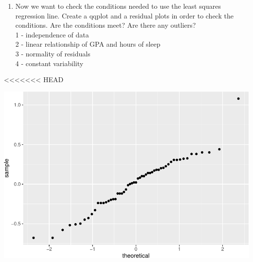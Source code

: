 \documentclass[]{article}
\newenvironment{Shaded}{\begin{snugshade}}{\end{snugshade}}
\newcommand{\DataTypeTok}[1]{\textcolor[rgb]{0.13,0.29,0.53}{#1}}
\newcommand{\DecValTok}[1]{\textcolor[rgb]{0.00,0.00,0.81}{#1}}
\newcommand{\KeywordTok}[1]{\textcolor[rgb]{0.13,0.29,0.53}{\textbf{#1}}}
\newcommand{\NormalTok}[1]{#1}
\newcommand{\OperatorTok}[1]{\textcolor[rgb]{0.81,0.36,0.00}{\textbf{#1}}}
\newcommand{\StringTok}[1]{\textcolor[rgb]{0.31,0.60,0.02}{#1}}
\providecommand{\tightlist}{%
  \setlength{\itemsep}{0pt}\setlength{\parskip}{0pt}}
\begin{document}
\begin{enumerate}
\def\labelenumi{\arabic{enumi}.}
\setcounter{enumi}{6}
\tightlist
\item
  Now we want to check the conditions needed to use the least squares
  regression line. Create a qqplot and a residual plots in order to
  check the conditions. Are the conditions meet? Are there any
  outliers?\\
  1 - independence of data\\
  2 - linear relationship of GPA and hours of sleep\\
  3 - normality of residuals\\
  4 - constant variability
\end{enumerate}

\textless{}\textless{}\textless{}\textless{}\textless{}\textless{}\textless{}
HEAD

\begin{Shaded}
\end{Shaded}

\includegraphics{lab-8-regression_files/figure-latex/unnamed-chunk-9-1.pdf}

\begin{Shaded}
\end{Shaded}
\end{document}
